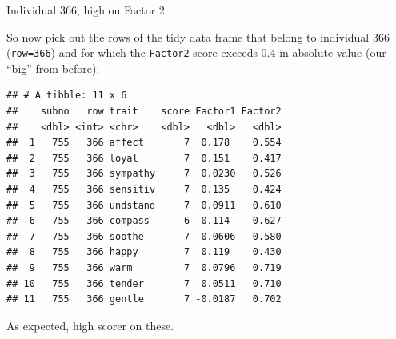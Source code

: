 \documentclass[ignorenonframetext,]{beamer}
\newenvironment{Shaded}{\begin{snugshade}}{\end{snugshade}}
\newcommand{\DecValTok}[1]{\textcolor[rgb]{0.00,0.00,0.81}{#1}}
\newcommand{\FloatTok}[1]{\textcolor[rgb]{0.00,0.00,0.81}{#1}}
\newcommand{\KeywordTok}[1]{\textcolor[rgb]{0.13,0.29,0.53}{\textbf{#1}}}
\newcommand{\NormalTok}[1]{#1}
\newcommand{\OperatorTok}[1]{\textcolor[rgb]{0.81,0.36,0.00}{\textbf{#1}}}
\newcommand{\StringTok}[1]{\textcolor[rgb]{0.31,0.60,0.02}{#1}}
\begin{document}
\begin{frame}[fragile]{Individual 366, high on Factor 2}
\protect\hypertarget{individual-366-high-on-factor-2}{}

So now pick out the rows of the tidy data frame that belong to
individual 366 (\texttt{row=366}) and for which the \texttt{Factor2}
score exceeds 0.4 in absolute value (our ``big'' from before):

\scriptsize

\begin{Shaded}
\end{Shaded}

\begin{verbatim}
## # A tibble: 11 x 6
##    subno   row trait    score Factor1 Factor2
##    <dbl> <int> <chr>    <dbl>   <dbl>   <dbl>
##  1   755   366 affect       7  0.178    0.554
##  2   755   366 loyal        7  0.151    0.417
##  3   755   366 sympathy     7  0.0230   0.526
##  4   755   366 sensitiv     7  0.135    0.424
##  5   755   366 undstand     7  0.0911   0.610
##  6   755   366 compass      6  0.114    0.627
##  7   755   366 soothe       7  0.0606   0.580
##  8   755   366 happy        7  0.119    0.430
##  9   755   366 warm         7  0.0796   0.719
## 10   755   366 tender       7  0.0511   0.710
## 11   755   366 gentle       7 -0.0187   0.702
\end{verbatim}

\normalsize

As expected, high scorer on these.

\end{frame}
\end{document}
